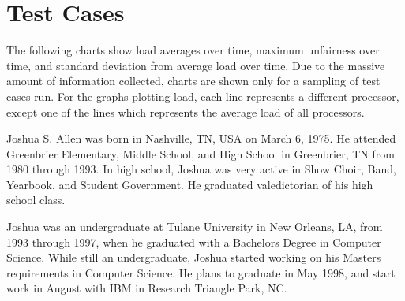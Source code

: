 \documentclass{report}
\begin{document}



\appendix                    %


%

\chapter{Test Cases}
\label{app:test-cases}

The following charts show load averages over time, maximum unfairness over
time, and standard deviation from average load over time.  Due to the
massive amount of information collected, charts are shown only for a
sampling of test cases run.  For the graphs plotting load, each line
represents a different processor, except one of the lines which represents
the average load of all processors.












\biography                   %

Joshua S. Allen was born in Nashville, TN, USA on March 6, 1975.  He
attended Greenbrier Elementary, Middle School, and High School in
Greenbrier, TN from 1980 through 1993.  In high school, Joshua was very
active in Show Choir, Band, Yearbook, and Student Government.  He graduated
valedictorian of his high school class.

Joshua was an undergraduate at Tulane University in New Orleans, LA, from
1993 through 1997, when he graduated with a Bachelors Degree in Computer
Science.  While still an undergraduate, Joshua started working on his
Masters requirements in Computer Science.  He plans to graduate in May 1998,
and start work in August with IBM in Research Triangle Park, NC.
\end{document}
